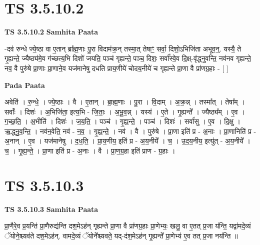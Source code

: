 \documentclass[17pt]{extarticle}
\begin{document}
\section*{ TS 3.5.10.2 }

\textbf{TS 3.5.10.2 } \newline
\textbf{Samhita Paata} \newline

-दव॑ रुन्धे ज्ये॒ष्ठा वा ए॒तान् ब्रा᳚ह्म॒णाः पु॒रा विदाम॑क्र॒न् तस्मा॒त् तेषाꣳ॒॒ सर्वा॒ दिशो॒ऽभिजि॑ता अभूव॒न्॒. यस्यै॒ ते गृ॒ह्यन्ते॒ ज्यैष्ठ्य॑मे॒व ग॑च्छत्य॒भि दिशो॑ जयति॒ पञ्च॑ गृह्यन्ते॒ पञ्च॒ दिशः॒ सर्वा᳚स्वे॒व दि॒क्ष्-वृ॑द्ध्नुवन्ति॒ नव॑नव गृह्यन्ते॒ नव॒ वै पुरु॑षे प्रा॒णाः प्रा॒णाने॒व यज॑मानेषु दधति प्राय॒णीये॑ चोदय॒नीये॑ च गृह्यन्ते प्रा॒णा वै प्रा॑णग्र॒हाः - [  ] \newline

\textbf{Pada Paata} \newline

अवेति॑ । रु॒न्धे॒ । ज्ये॒ष्ठाः । वै । ए॒तान् । ब्रा॒ह्म॒णाः । पु॒रा । वि॒दाम् । अ॒क्र॒न्न् । तस्मा᳚त् । तेषा᳚म् । सर्वाः᳚ । दिशः॑ । अ॒भिजि॑ता॒ इत्य॒भि - जि॒ताः॒ । अ॒भू॒व॒न्न् । यस्य॑ । ए॒ते । गृ॒ह्यन्ते᳚ । ज्यैष्ठ्य᳚म् । ए॒व । ग॒च्छ॒ति॒ । अ॒भीति॑ । दिशः॑ । ज॒य॒ति॒ । पञ्च॑ । गृ॒ह्य॒न्ते॒ । पञ्च॑ । दिशः॑ । सर्वा॑सु । ए॒व । दि॒क्षु । ऋ॒द्ध्नु॒व॒न्ति॒ । नव॑न॒वेति॒ नव॑ - न॒व॒ । गृ॒ह्य॒न्ते॒ । नव॑ । वै । पुरु॑षे । प्रा॒णा इति॑ प्र - अ॒नाः । प्रा॒णानिति॑ प्र - अ॒नान् । ए॒व । यज॑मानेषु । द॒ध॒ति॒ । प्रा॒य॒णीय॒ इति॑ प्र - अ॒य॒नीये᳚ । च॒ । उ॒द॒य॒नीय॒ इत्यु॑त् - अ॒य॒नीये᳚ । च॒ । गृ॒ह्य॒न्ते॒ । प्रा॒णा इति॑ प्र - अ॒नाः । वै । प्रा॒ण॒ग्र॒हा इति॑ प्राण - ग्र॒हाः ।  \newline




\section*{ TS 3.5.10.3 }

\textbf{TS 3.5.10.3 } \newline
\textbf{Samhita Paata} \newline

प्रा॒णैरे॒व प्र॒यन्ति॑ प्रा॒णैरुद्य॑न्ति दश॒मेऽह॑न् गृह्यन्ते प्रा॒णा वै प्रा॑णग्र॒हाः प्रा॒णेभ्यः॒ खलु॒ वा ए॒तत् प्र॒जा य॑न्ति॒ यद्वा॑मदे॒व्यं ॅयोने॒श्च्यव॑ते दश॒मेऽह॑न्. वामदे॒व्यं ॅयोने᳚श्च्यवते॒ यद्-द॑श॒मेऽह॑न् गृ॒ह्यन्ते᳚ प्रा॒णेभ्य॑ ए॒व तत् प्र॒जा नय॑न्ति ॥ \newline
\end{document}

